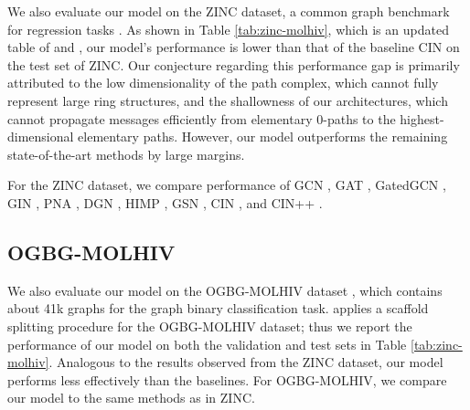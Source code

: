 \documentclass[letterpaper]{article} \usepackage{aaai24}  \usepackage{times}  \usepackage{helvet}  \usepackage{courier}  \usepackage[hyphens]{url}  \usepackage{graphicx} \urlstyle{rm} \def\UrlFont{\rm}  \usepackage{natbib}  \usepackage{caption} \frenchspacing  \setlength{\pdfpagewidth}{8.5in} \setlength{\pdfpageheight}{11in} \usepackage{algorithm}
\begin{document}
We also evaluate our model on the ZINC dataset, a common graph benchmark for regression tasks \cite{sterling_zinc15_2015,dwivedi_benchmarkgnns_2020}. As shown in Table \ref{tab:zinc-molhiv}, which is an updated table of \cite{bouritsas_improving_2021} and \cite{giusti_cin_2023}, our model's performance is lower than that of the baseline CIN \cite{bodnar_weisfeiler_2022} on the test set of ZINC. Our conjecture regarding this performance gap is primarily attributed to the low dimensionality of the path complex, which cannot fully represent large ring structures, and the shallowness of our architectures, which cannot propagate messages efficiently from elementary 0-paths to the highest-dimensional elementary paths. However, our model outperforms the remaining state-of-the-art methods by large margins.

For the ZINC dataset, we compare performance of GCN \cite{kipf_semi-supervised_2017}, GAT \cite{velickovic_graph_2018}, GatedGCN \cite{bresson_residual_2018}, GIN \cite{xu_how_2019}, PNA \cite{corso_pna_2020}, DGN \cite{beaini_directional_2020}, HIMP \cite{fey_hierarchical_2020}, GSN \cite{bouritsas_improving_2021}, CIN \cite{bodnar_weisfeiler_2022}, and CIN++ \cite{giusti_cin_2023}.

\subsection{OGBG-MOLHIV} \label{subsec:molhiv}

We also evaluate our model on the OGBG-MOLHIV dataset \cite{hu_ogb_2020}, which contains about 41k graphs for the graph binary classification task. \citeauthor{hu_ogb_2020} applies a scaffold splitting procedure \cite{wu_moleculenet_2018} for the OGBG-MOLHIV dataset; thus we report the performance of our model on both the validation and test sets in Table \ref{tab:zinc-molhiv}. Analogous to the results observed from the ZINC dataset, our model performs less effectively than the baselines. For OGBG-MOLHIV, we compare our model to the same methods as in ZINC.
\end{document}
